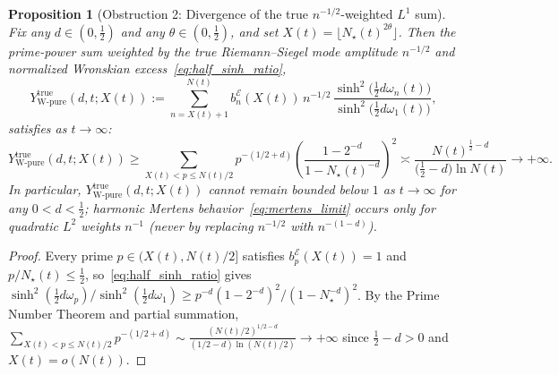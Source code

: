\documentclass[11pt,reqno]{amsart}
\theoremstyle{plain}
\newtheorem{proposition}[theorem]{Proposition}
\theoremstyle{definition}
\theoremstyle{remark}
\numberwithin{equation}{section}
\begin{document}
\begin{proposition}[Obstruction 2: Divergence of the true $n^{-1/2}$-weighted $L^1$ sum]\label{prop:l1_divergence}
Fix any $d \in (0, \frac{1}{2})$ and any $\theta \in (0, \frac{1}{2})$, and set $X(t) = \lfloor N_\star(t)^{2\theta}\rfloor$. Then the prime-power sum weighted by the true Riemann--Siegel mode amplitude $n^{-1/2}$ and normalized Wronskian excess~\eqref{eq:half_sinh_ratio},
\begin{equation}\label{eq:L1_true_sum}
Y_{\mathrm{W\text{-}pure}}^{\mathrm{true}}(d,t; X(t)) := \sum_{n = X(t) + 1}^{N(t)} b_n^{\mathcal{E}}(X(t))\,n^{-1/2}\,\frac{\sinh^2\!\bigl(\frac{1}{2}d\omega_n(t)\bigr)}{\sinh^2\!\bigl(\frac{1}{2}d\omega_1(t)\bigr)},
\end{equation}
satisfies as $t \to \infty$:
\begin{equation}\label{eq:L1_divergence_asymp}
Y_{\mathrm{W\text{-}pure}}^{\mathrm{true}}(d,t; X(t)) \ge \sum_{X(t) < p \le N(t)/2} p^{-(1/2 + d)}\!\left(\frac{1 - 2^{-d}}{1 - N_\star(t)^{-d}}\right)^{\!2} \asymp \frac{N(t)^{\frac{1}{2} - d}}{\bigl(\frac{1}{2} - d\bigr)\ln N(t)} \longrightarrow +\infty.
\end{equation}
In particular, $Y_{\mathrm{W\text{-}pure}}^{\mathrm{true}}(d,t; X(t))$ cannot remain bounded below $1$ as $t \to \infty$ for any $0 < d < \frac{1}{2}$; harmonic Mertens behavior~\eqref{eq:mertens_limit} occurs only for quadratic $L^2$ weights $n^{-1}$ (never by replacing $n^{-1/2}$ with $n^{-(1-d)}$).
\end{proposition}

\begin{proof}
Every prime $p \in (X(t), N(t)/2]$ satisfies $b_p^{\mathcal{E}}(X(t)) = 1$ and $p/N_\star(t) \le \frac{1}{2}$, so~\eqref{eq:half_sinh_ratio} gives $\sinh^2(\frac{1}{2}d\omega_p)/\sinh^2(\frac{1}{2}d\omega_1) \ge p^{-d}(1 - 2^{-d})^2/(1 - N_\star^{-d})^2$. By the Prime Number Theorem and partial summation, $\sum_{X(t) < p \le N(t)/2} p^{-(1/2+d)} \sim \frac{(N(t)/2)^{1/2-d}}{(1/2-d)\ln(N(t)/2)} \to +\infty$ since $\frac{1}{2} - d > 0$ and $X(t) = o(N(t))$.
\end{proof}
\end{document}
